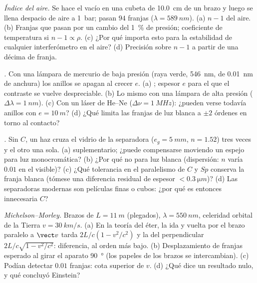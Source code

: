 \begin{exercise}[$\star\star$]\label{exo:b2:michelson:6}
\emph{Índice del aire.} Se hace el vacío en una cubeta de \qty{10.0}{cm} de un brazo y luego
se llena despacio de aire a \qty{1}{bar}; pasan $94$ franjas ($\lambda = \qty{589}{nm}$).
(a) $n - 1$ del aire. (b) Franjas que pasan por un cambio del \qty{1}{\%} de
presión; coeficiente de temperatura si $n - 1 \propto \rho$. (c) ¿Por qué importa esto
para la estabilidad de cualquier interferómetro en el aire? (d) Precisión sobre
$n - 1$ a partir de una décima de franja.
\end{exercise}

\begin{exercise}[$\star\star$]\label{exo:b2:michelson:7}
\emph{.} Con una lámpara de mercurio de baja presión (raya verde,
\qty{546}{nm}, de \qty{0.01}{nm} de anchura) los anillos se apagan al crecer $e$. (a) ; espesor $e$ para el que el contraste se vuelve despreciable. (b) Lo mismo
con una lámpara de alta presión ($\Delta\lambda = \qty{1}{nm}$). (c) Con un láser de He--Ne
($\Delta\nu = \qty{1}{MHz}$): ¿pueden verse todavía anillos con $e = \qty{10}{m}$? (d) ¿Qué
limita las franjas de luz blanca a $\pm2$ órdenes en torno al contacto?
\end{exercise}

\begin{exercise}[$\star\star$]\label{exo:b2:michelson:8}
\emph{.} Sin $C$, un haz cruza el vidrio de la
separadora ($e_g = \qty{5}{mm}$, $n = 1.52$) tres veces y el otro una sola. (a)
 suplementario; ¿puede compensarse moviendo un espejo para
luz monocromática? (b) ¿Por qué no para luz blanca (dispersión: $n$
varía $0.01$ en el visible)? (c) ¿Qué tolerancia en el
paralelismo de $C$ y $Sp$ conserva la franja blanca (tómese una diferencia
residual de espesor $< \qty{0.3}{\micro m}$)? (d) Las separadoras modernas son
películas finas o cubos: ¿por qué es entonces innecesaria $C$?
\end{exercise}

\begin{exercise}[$\star\star$]\label{exo:b2:michelson:9}
\emph{Michelson--Morley.} Brazos de $L = \qty{11}{m}$ (plegados), $\lambda = \qty{550}{nm}$,
celeridad orbital de la Tierra $v = \qty{30}{km/s}$. (a) En la teoría del éter, la
ida y vuelta por el brazo paralelo a $\vect v$ tarda $2L/c(1 - v^2/c^2)$
y la del perpendicular $2L/c\sqrt{1 - v^2/c^2}$: diferencia, al orden más
bajo. (b) Desplazamiento de franjas esperado al girar el aparato \qty{90}{\degree}
(los papeles de los brazos se intercambian). (c) Podían detectar $0.01$ franjas: cota
superior de $v$. (d) ¿Qué dice un resultado nulo, y qué concluyó
Einstein?
\end{exercise}

